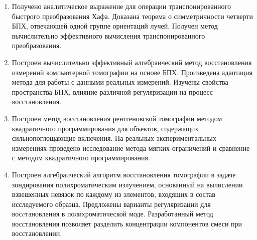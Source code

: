 \begin{enumerate}
  \item Получено аналитическое выражение для операции транспонированного быстрого преобразования Хафа. Доказана теорема о симметричности четверти БПХ, отвечающей одной группе ориентаций лучей. Получен метод вычислительно эффективного вычисления транспонированного преобразования.
  \item Построен вычислительно эффективный алгебраический метод восстановления измерений компьютерной томографии на основе БПХ. Произведена адаптация метода для работы с данными реальных измерений. Изучены свойства пространства БПХ, влияние различной регуляризации на процесс восстановления.
  \item Построен метод восстановления рентгеновской томографии методом квадратичного программирования для объектов, содержащих сильнопоглощающие включения. На реальных экспериментальных измерениях проведено исследование метода мягких ограничений и сравнение с методом квадратичного программирования.
  \item Построен алгебраический алгоритм восстановления томографии в задаче зондирования полихроматическим излучением, основанный на вычислении взвешенных невязок по каждому из элементов, входящих в состав исследуемого образца. Предложены варианты регуляризации для восcтановления в полихроматической моде. Разработанный метод восстановления позволяет разделить концентрации компонентов смеси при восстановлении.
\end{enumerate}
